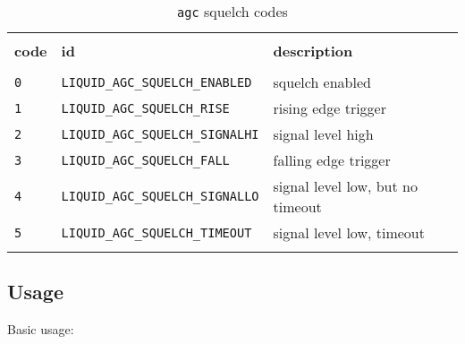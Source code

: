 \begin{table}[!ht]
\caption{{\tt agc} squelch codes}
\label{tab:module:agc:squelch_codes}
\centering
\begin{tabular*}{0.95\textwidth}{@{\extracolsep{\fill}}lll}

\hline\hline \\[-6pt]
{\bf code} & {\bf id} & {\bf description} \\[6pt]
\hline \\[-6pt]
{\tt 0} & {\tt LIQUID\_AGC\_SQUELCH\_ENABLED}    & squelch enabled \\
{\tt 1} & {\tt LIQUID\_AGC\_SQUELCH\_RISE}       & rising edge trigger \\
{\tt 2} & {\tt LIQUID\_AGC\_SQUELCH\_SIGNALHI}   & signal level high \\
{\tt 3} & {\tt LIQUID\_AGC\_SQUELCH\_FALL}       & falling edge trigger \\
{\tt 4} & {\tt LIQUID\_AGC\_SQUELCH\_SIGNALLO}   & signal level low, but no timeout \\
{\tt 5} & {\tt LIQUID\_AGC\_SQUELCH\_TIMEOUT}    & signal level low, timeout \\ \\[-6pt]

\hline\hline
\end{tabular*}
\end{table}%

\subsection{Usage}
Basic usage:


